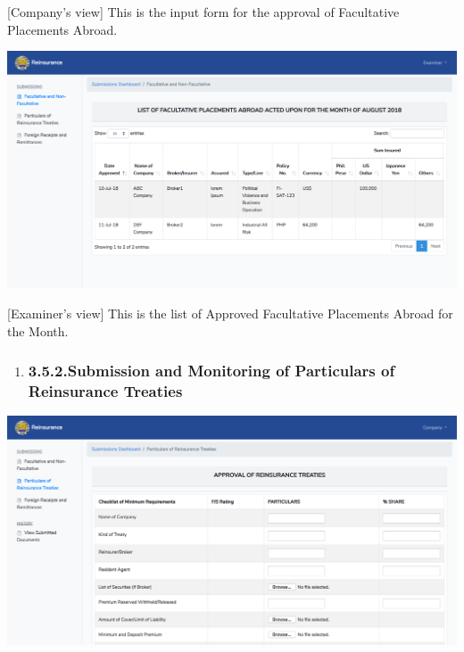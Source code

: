 \documentclass{article}
\begin{document}
[Company’s view] This is the input form for the
approval of Facultative Placements Abroad.%

\includegraphics[keepaspectratio=true]{up-ic-screens/image130}{}%

[Examiner’s view] This is the list of Approved
Facultative Placements Abroad for the Month.%

\begin{enumerate}[noitemsep,topsep=\mdcompacttopsep]%

\item{}
\subsubsection{3.5.2.\hspace*{0.5em}Submission and Monitoring of Particulars of Reinsurance Treaties}\label{sec-submission-and-monitoring-of-particulars-of-reinsurance-treaties}%
\end{enumerate}%

\noindent{}\includegraphics[keepaspectratio=true]{up-ic-screens/image59}{}%
\end{document}
